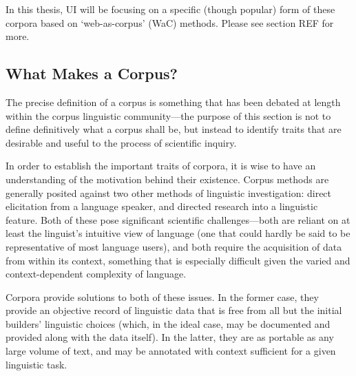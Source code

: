 
In this thesis, UI will be focusing on a specific (though popular) form of these corpora based on `web-as-corpus' (WaC) methods.  Please see section REF for more.




\subsection{What Makes a Corpus?} %

The precise definition of a corpus is something that has been debated at length within the corpus linguistic community---the purpose of this section is not to define definitively what a corpus shall be, but instead to identify traits that are desirable and useful to the process of scientific inquiry.



In order to establish the important traits of corpora, it is wise to have an understanding of the motivation behind their existence.  Corpus methods are generally posited against two other methods of linguistic investigation: direct elicitation from a language speaker, and directed research into a linguistic feature.  Both of these pose significant scientific challenges---both are reliant on at least the linguist's intuitive view of language (one that could hardly be said to be representative of most language users), and both require the acquisition of data from within its context, something that is especially difficult given the varied and context-dependent complexity of language.

Corpora provide solutions to both of these issues.  In the former case, they provide an objective record of linguistic data that is free from all but the initial builders' linguistic choices (which, in the ideal case, may be documented and provided along with the data itself).  In the latter, they are as portable as any large volume of text, and may be annotated with context sufficient for a given linguistic task.


